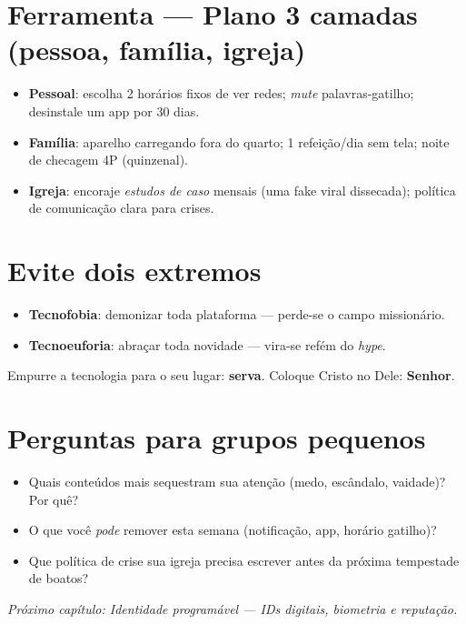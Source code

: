 \section{Ferramenta --- Plano 3 camadas (pessoa, família, igreja)}
\begin{checklist}[title={Protocolos práticos},breakable]
\begin{itemize}[leftmargin=*,noitemsep]
  \item \textbf{Pessoal}: escolha 2 horários fixos de ver redes; \emph{mute} palavras-gatilho; desinstale um app por 30 dias.
  \item \textbf{Família}: aparelho carregando fora do quarto; 1 refeição/dia sem tela; noite de checagem 4P (quinzenal).
  \item \textbf{Igreja}: encoraje \emph{estudos de caso} mensais (uma fake viral dissecada); política de comunicação clara para crises.
\end{itemize}
\end{checklist}

\section{Evite dois extremos}
\begin{itemize}[leftmargin=*,noitemsep]
  \item \textbf{Tecnofobia}: demonizar toda plataforma --- perde-se o campo missionário.
  \item \textbf{Tecnoeuforia}: abraçar toda novidade --- vira-se refém do \emph{hype}.
\end{itemize}
Empurre a tecnologia para o seu lugar: \textbf{serva}. Coloque Cristo no Dele: \textbf{Senhor}.

\section{Perguntas para grupos pequenos}
\begin{itemize}[leftmargin=*,noitemsep]
  \item Quais conteúdos mais sequestram sua atenção (medo, escândalo, vaidade)? Por quê?
  \item O que você \textit{pode} remover esta semana (notificação, app, horário gatilho)?
  \item Que política de crise sua igreja precisa escrever antes da próxima tempestade de boatos?
\end{itemize}

\bigskip
\noindent\textit{Próximo capítulo: Identidade programável --- IDs digitais, biometria e reputação.}

